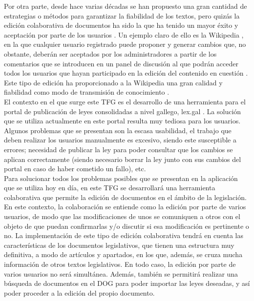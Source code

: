 Por otra parte, desde hace varias décadas se han propuesto una gran cantidad de estrategias o métodos para garantizar la fiabilidad de los textos, pero quizás la edición colaborativa de documentos ha sido la que ha tenido un mayor éxito y aceptación por parte de los usuarios \cite{collaborative}. Un ejemplo claro de ello es la Wikipedia \cite{wikipedia}, en la que cualquier usuario registrado puede proponer y generar cambios que, no obstante, deberán ser aceptados por los administradores a partir de los comentarios que se introducen en un panel de discusión al que podrán acceder todos los usuarios que hayan participado en la edición del contenido en cuestión \cite{knowledge}. Este tipo de edición ha proporcionado a la Wikipedia una gran calidad y fiabilidad como modo de transmisión de conocimiento \cite{trustworthiness}.
\\

El contexto en el que surge este TFG es el desarrollo de una herramienta para el portal de publicación de leyes consolidadas a nivel gallego, lex.gal \cite{lexgal}. La solución que se utiliza actualmente en este portal resulta muy tediosa para los usuarios. Algunos problemas que se presentan son la escasa usabilidad, el trabajo que deben realizar los usuarios manualmente es excesivo, siendo este susceptible a errores; necesidad de publicar la ley para poder consultar que los cambios se aplican correctamente (siendo necesario borrar la ley junto con sus cambios del portal en caso de haber cometido un fallo), etc.
\\

Para solucionar todos los problemas posibles que se presentan en la aplicación que se utiliza hoy en día, en este TFG se desarrollará una herramienta colaborativa que permite la edición de documentos en el ámbito de la legislación. En este contexto, la colaboración se entiende como la edición por parte de varios usuarios, de modo que las modificaciones de unos se comuniquen a otros con el objeto de que puedan confirmarlas y/o discutir si esa modificación es pertinente o no. La implementación de este tipo de edición colaborativa tendrá en cuenta las características de los documentos legislativos, que tienen una estructura muy definitiva, a modo de artículos y apartados, en los que, además, se cruza mucha información de otros textos legislativos. En todo caso, la edición por parte de varios usuarios no será simultánea. Además, también se permitirá realizar una búsqueda de documentos en el DOG para poder importar las leyes deseadas, y así poder proceder a la edición del propio documento.